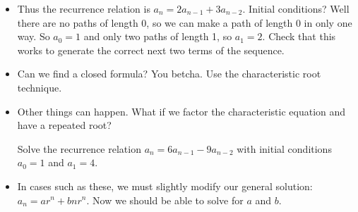 \documentclass[12pt]{article}
\theoremstyle{plain}
\theoremstyle{definition}
\theoremstyle{remark}
\newcommand{\ex}{\noindent{\bf Ex: }}
\begin{document}
\begin{itemize}
  \item Thus the recurrence relation is $a_n = 2a_{n-1} + 3a_{n-2}$.  Initial conditions?  Well there are no paths of length 0, so we can make a path of length 0 in only one way.  So $a_0 = 1$ and only two paths of length 1, so $a_1 = 2$.  Check that this works to generate the correct next two terms of the sequence.

  \item Can we find a closed formula?  You betcha.  Use the characteristic root technique.

  \item Other things can happen.  What if we factor the characteristic equation and have a repeated root?

  \ex  Solve the recurrence relation $a_n = 6a_{n-1} - 9a_{n-2}$ with initial conditions $a_0 = 1$ and $a_1 = 4$.

  \item In cases such as these, we must slightly modify our general solution: $a_n = ar^n + bnr^n$.  Now we should be able to solve for $a$ and $b$.
 \end{itemize}
\end{document}
